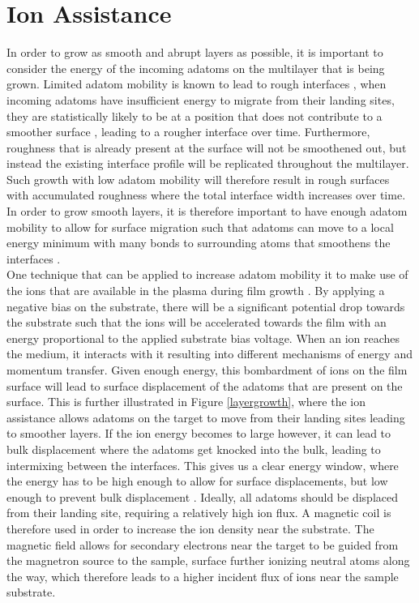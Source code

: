 \section{Ion Assistance}\label{ion_assistance}
In order to grow as smooth and abrupt layers as possible, it is important to consider the energy of the incoming adatoms on the multilayer that is being grown. Limited adatom mobility is known to lead to rough interfaces \cite{rough_morphology}, when incoming adatoms have insufficient energy to migrate from their landing sites, they are statistically likely to be at a position that does not contribute to a smoother surface \cite{ERIKSSON200684}, leading to a rougher interface over time. Furthermore, roughness that is already present at the surface will not be smoothened out, but instead the existing interface profile will be replicated throughout the multilayer. Such growth with low adatom mobility will therefore result in rough surfaces with accumulated roughness \cite{thesis_fredrik} where  the total interface width increases over time. In order to grow smooth layers, it is therefore important to have enough adatom mobility to allow for surface migration such that adatoms can move to a local energy minimum with many bonds to surrounding atoms that smoothens the interfaces \cite{ERIKSSON200684}. \\
One technique that can be applied to increase adatom mobility it to make use of the ions that are available in the plasma during film growth \cite{thesis_kenneth}. By applying a negative bias on the substrate, there will be a significant potential drop towards the substrate such that the ions will be accelerated towards the film with an energy proportional to the applied substrate bias voltage. When an ion reaches the medium, it interacts with it resulting into different mechanisms of energy and momentum transfer. Given enough energy, this bombardment of ions on the film surface will lead to surface displacement of the adatoms that are present on the surface. This is further illustrated in Figure \ref{layergrowth}, where the ion assistance allows adatoms on the target to move from their landing sites leading to smoother layers. If the ion energy becomes to large however, it can lead to bulk displacement where the adatoms get knocked into the bulk, leading to intermixing between the interfaces. This gives us a clear energy window, where the energy has to be high enough to allow for surface displacements, but low enough to prevent bulk displacement \cite{ERIKSSON200684}. Ideally, all adatoms should be displaced from their landing site, requiring a relatively high ion flux. A magnetic coil is therefore used in order to increase the ion density near the substrate. The magnetic field allows for secondary electrons near the target to be guided from the magnetron source to the sample, surface further ionizing neutral atoms along the way, which therefore leads to a higher incident flux of ions near the sample substrate. 

